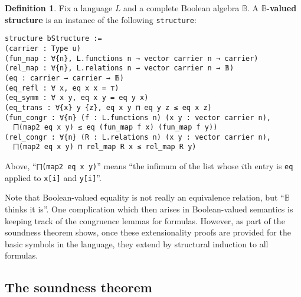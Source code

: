\documentclass[a4paper,USenglish,cleveref, autoref]{lipics-v2019}
\newcommand{\B}{\mathbb{B}}
\newcommand{\lil}{\lstinline}
\theoremstyle{theorem}
\theoremstyle{definition}
\newtheorem{defn}[definition]{Definition}
\begin{document}
\begin{defn}\label{def-boolean-valued-structure}
  Fix a language $L$ and a complete Boolean algebra $\B$. %
  A \textbf{$\B$-valued structure} is an instance of the following \lil{structure}:
  \begin{lstlisting}
structure bStructure :=
(carrier : Type u)
(fun_map : ∀{n}, L.functions n → vector carrier n → carrier)
(rel_map : ∀{n}, L.relations n → vector carrier n → 𝔹)
(eq : carrier → carrier → 𝔹)
(eq_refl : ∀ x, eq x x = ⊤)
(eq_symm : ∀ x y, eq x y = eq y x)
(eq_trans : ∀{x} y {z}, eq x y ⊓ eq y z ≤ eq x z)
(fun_congr : ∀{n} (f : L.functions n) (x y : vector carrier n),
  ⨅(map2 eq x y) ≤ eq (fun_map f x) (fun_map f y))
(rel_congr : ∀{n} (R : L.relations n) (x y : vector carrier n),
  ⨅(map2 eq x y) ⊓ rel_map R x ≤ rel_map R y)
\end{lstlisting}
Above, ``\lstinline{⨅(map2 eq x y)}'' means ``the infimum of the list whose $i$th entry is \lil{eq} applied to \lil{x[i]} and \lil{y[i]}''.
\end{defn}
Note that Boolean-valued equality is not really an equivalence relation, but ``$\B$ thinks it is''. One complication which then arises in Boolean-valued semantics is keeping track of the congruence lemmas for formulas. However, as part of the soundness theorem shows, once these extensionality proofs are provided for the basic symbols in the language, they extend by structural induction to all formulas.

\subsection{The soundness theorem}
\end{document}
